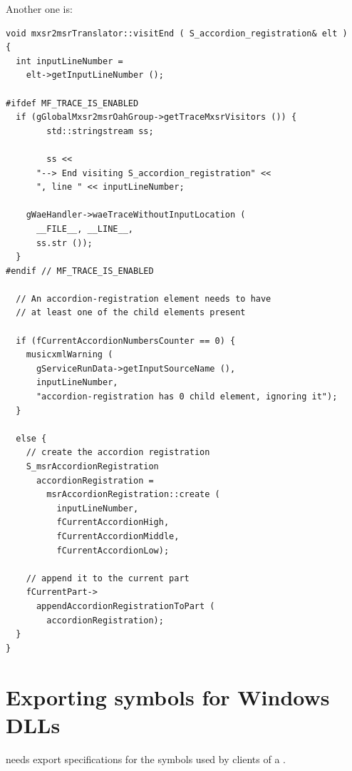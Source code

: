 Another one is:
\begin{lstlisting}[language=CPlusPlus]
void mxsr2msrTranslator::visitEnd ( S_accordion_registration& elt )
{
  int inputLineNumber =
    elt->getInputLineNumber ();

#ifdef MF_TRACE_IS_ENABLED
  if (gGlobalMxsr2msrOahGroup->getTraceMxsrVisitors ()) {
		std::stringstream ss;

		ss <<
      "--> End visiting S_accordion_registration" <<
      ", line " << inputLineNumber;

    gWaeHandler->waeTraceWithoutInputLocation (
      __FILE__, __LINE__,
      ss.str ());
  }
#endif // MF_TRACE_IS_ENABLED

  // An accordion-registration element needs to have
  // at least one of the child elements present

  if (fCurrentAccordionNumbersCounter == 0) {
    musicxmlWarning (
      gServiceRunData->getInputSourceName (),
      inputLineNumber,
      "accordion-registration has 0 child element, ignoring it");
  }

  else {
    // create the accordion registration
    S_msrAccordionRegistration
      accordionRegistration =
        msrAccordionRegistration::create (
          inputLineNumber,
          fCurrentAccordionHigh,
          fCurrentAccordionMiddle,
          fCurrentAccordionLow);

    // append it to the current part
    fCurrentPart->
      appendAccordionRegistrationToPart (
        accordionRegistration);
  }
}
\end{lstlisting}


\section{Exporting symbols for Windows DLLs}

 needs export specifications for the symbols used by clients of a .


